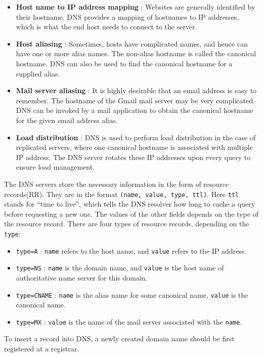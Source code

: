 \documentclass[12pt,letterpaper]{book}
\theoremstyle{definition}
\begin{document}
\begin{itemize}
  \item \textbf{Host name to IP address mapping} : Websites are generally identified by their hostname. DNS provides a mapping of hostnames to IP addresses, which is what the end host needs to connect to the server.
  \item \textbf{Host aliasing} : Sometimes, hosts have complicated names, and hence can have one or more alias names. The non-alias hostname is called the canonical hostname. DNS can also be used to find the canonical hostname for a supplied alias.
  \item \textbf{Mail server aliasing} : It is highly desirable that an email address is easy to remember. The hostname of the Gmail mail server may be very complicated. DNS can be invoked by a mail application to obtain the canonical hostname for the given email address alias.
  \item \textbf{Load distribution} : DNS is used to perform load distribution in the case of replicated servers, where one canonical hostname is associated with multiple IP address. The DNS server rotates these IP addresses upon every query to ensure load management.
\end{itemize}

The DNS servers store the necessary information in the form of resource records(RR). They are in the format \texttt{(name, value, type, ttl)}. Here \texttt{ttl} stands for ``time to live'', which tells the DNS resolver how long to cache a query before requesting a new one. The values of the other fields depends on the type of the resource record. There are four types of resource records, depending on the \texttt{type}:

\begin{itemize}
  \item \texttt{type=A} : \texttt{name} refers to the host name, and \texttt{value} refers to the IP address.
  \item \texttt{type=NS} : \texttt{name} is the domain name, and \texttt{value} is the host name of authoritative name server for this domain.
  \item \texttt{type=CNAME} : \texttt{name} is the alias name for some canonical name, \texttt{value} is the canonical name.
\item \texttt{type=MX} : \texttt{value} is the name of the mail server associated with the \texttt{name}.
\end{itemize}

To insert a record into DNS, a newly created domain name should be first registered at a registrar.
\end{document}
